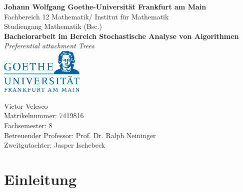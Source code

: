 \documentclass[12pt]{report}
\begin{document}
\author{Victor Velesco}
\begin{titlepage}
\vspace*{1cm}
\begin{center}
\large
\textbf{Johann Wolfgang Goethe-Universität Frankfurt am Main}\\
Fachbereich 12 Mathematik/ Institut für Mathematik\\
Studiengang Mathematik (Bsc.)\\
\vspace{1cm}
\Large
\textbf{Bachelorarbeit im Bereich Stochastische Analyse von Algorithmen}\\
\vspace{0.5cm}
\Large
\textit{Preferential attachment Trees}\\
\vspace{3cm}
\includegraphics[width = 4cm]{Pictures/1280px-Goethe-Logo.svg.png}
\vspace{3cm}

\end{center}

Victor Velesco\\
Matrikelnummer: 7419816\\
Fachsemester: 8\\
Betreuender Professor: Prof. Dr. Ralph Neininger\\
Zweitgutachter: Jasper Ischebeck\\
\end{titlepage}
\section{Einleitung}
\end{document}
